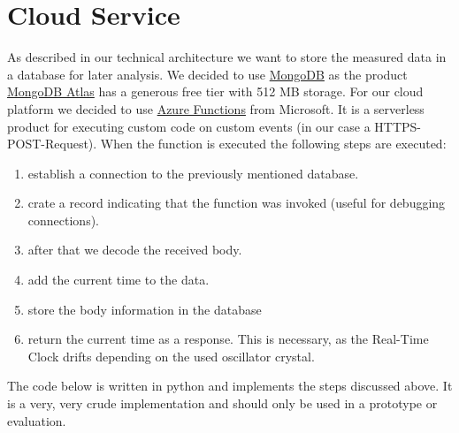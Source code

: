 
\section{Cloud Service}

As described in our technical architecture we want to store the measured data in a database for later analysis.
We decided to use \href{https://www.mongodb.com/de-de}{MongoDB} as the product \href{https://www.mongodb.com/products/platform/atlas-database}{MongoDB Atlas} has a generous free tier with 512 MB storage.
For our cloud platform we decided to use \href{https://azure.microsoft.com/de-de/products/functions/}{Azure Functions} from Microsoft. 
It is a serverless product for executing custom code on custom events (in our case a HTTPS-POST-Request).
When the function is executed the following steps are executed:

\begin{enumerate}
    \item establish a connection to the previously mentioned database.
    \item crate a record indicating that the function was invoked (useful for debugging connections).
    \item after that we decode the received body.
    \item add the current time to the data.
    \item store the body information in the database
    \item return the current time as a response. This is necessary, as the Real-Time Clock drifts depending on the used oscillator crystal.
\end{enumerate}

The code below is written in python and implements the steps discussed above. It is a very, very crude implementation and should only be used in a prototype or evaluation.

